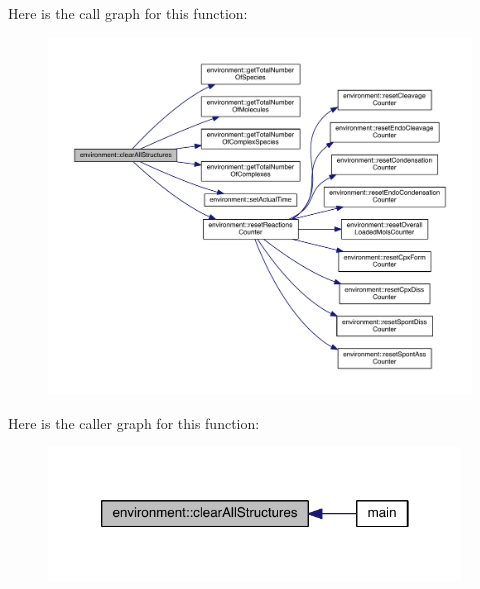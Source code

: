 Here is the call graph for this function\+:\nopagebreak
\begin{figure}[H]
\begin{center}
\leavevmode
\includegraphics[width=350pt]{a00013_aa860227725dbe5b0251a25f440773161_cgraph}
\end{center}
\end{figure}




Here is the caller graph for this function\+:\nopagebreak
\begin{figure}[H]
\begin{center}
\leavevmode
\includegraphics[width=310pt]{a00013_aa860227725dbe5b0251a25f440773161_icgraph}
\end{center}
\end{figure}


